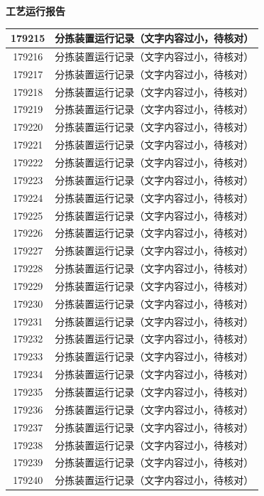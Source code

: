 \documentclass[UTF8,10pt,a4paper,fontset=fandol]{ctexart}
\begin{document}
\begin{center}
\begin{minipage}[t]{0.46\textwidth}
\centering
\textbf{工艺运行报告}

\small
\begin{tabularx}{\linewidth}{|c|X|}
\hline
179215 & 分拣装置运行记录（文字内容过小，待核对）\\ \hline
179216 & 分拣装置运行记录（文字内容过小，待核对）\\ \hline
179217 & 分拣装置运行记录（文字内容过小，待核对）\\ \hline
179218 & 分拣装置运行记录（文字内容过小，待核对）\\ \hline
179219 & 分拣装置运行记录（文字内容过小，待核对）\\ \hline
179220 & 分拣装置运行记录（文字内容过小，待核对）\\ \hline
179221 & 分拣装置运行记录（文字内容过小，待核对）\\ \hline
179222 & 分拣装置运行记录（文字内容过小，待核对）\\ \hline
179223 & 分拣装置运行记录（文字内容过小，待核对）\\ \hline
179224 & 分拣装置运行记录（文字内容过小，待核对）\\ \hline
179225 & 分拣装置运行记录（文字内容过小，待核对）\\ \hline
179226 & 分拣装置运行记录（文字内容过小，待核对）\\ \hline
179227 & 分拣装置运行记录（文字内容过小，待核对）\\ \hline
179228 & 分拣装置运行记录（文字内容过小，待核对）\\ \hline
179229 & 分拣装置运行记录（文字内容过小，待核对）\\ \hline
179230 & 分拣装置运行记录（文字内容过小，待核对）\\ \hline
179231 & 分拣装置运行记录（文字内容过小，待核对）\\ \hline
179232 & 分拣装置运行记录（文字内容过小，待核对）\\ \hline
179233 & 分拣装置运行记录（文字内容过小，待核对）\\ \hline
179234 & 分拣装置运行记录（文字内容过小，待核对）\\ \hline
179235 & 分拣装置运行记录（文字内容过小，待核对）\\ \hline
179236 & 分拣装置运行记录（文字内容过小，待核对）\\ \hline
179237 & 分拣装置运行记录（文字内容过小，待核对）\\ \hline
179238 & 分拣装置运行记录（文字内容过小，待核对）\\ \hline
179239 & 分拣装置运行记录（文字内容过小，待核对）\\ \hline
179240 & 分拣装置运行记录（文字内容过小，待核对）\\ \hline
\end{tabularx}


\end{minipage}
\end{center}
\end{document}
